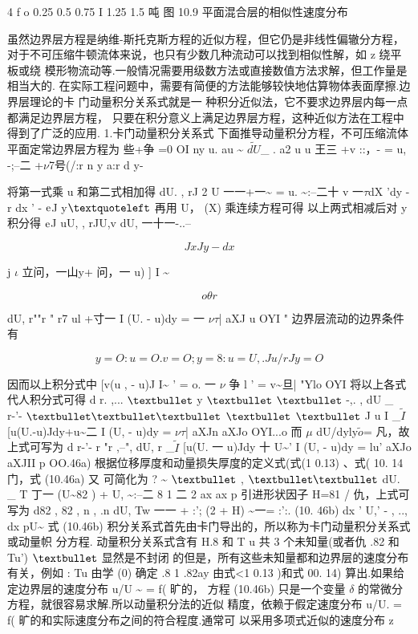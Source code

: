 4 f o 0.25 0.5 0.75 I 1.25 1.5 吨 图 10.9 平面混合层的相似性速度分布

虽然边界层方程是纳维-斯托克斯方程的近似方程，但它仍是非线性偏辙分方程， 对于不可压缩牛顿流体来说，也只有少数几种流动可以找到相似性解，如 z 绕平板或绕 模形物流动等.一般情况需要用级数方法或直接数值方法求解，但工作量是相当大的. 在实际工程问题中，需要有简便的方法能够较快地估算物体表面摩擦.边界层理论的卡 门动量积分关系式就是一 种积分近似法，它不要求边界层内每一点都满足边界层方程， 只要在积分意义上满足边界层方程，这种近似方法在工程中得到了广泛的应用. 1.卡门动量积分关系式 下面推导动量积分方程，不可压缩流体平面定常边界层方程为 些+争 =0 OI ny u. au \textasciitilde{} $\tilde{dU}$\_ . a2 u u 王三 +v ::，- = u, -;--二 +$\nu$7号(/:r n y a:r d y-

将第一式乘 u 和第二式相加得 dU. , rJ 2 U 一一+一\textasciitilde{} = u. \textasciitilde{}:--二十 v 一$\tau$dX 'dy - r dx ' - ${\rm e}$J y${\rm ‘}$ 再用 U， (X) 乘连续方程可得 以上两式相减后对 y 积分得 ${\rm e}$J uU, , rJU,v dU, 一十一-..--

\[Jx Jy - dx\]

j $\iota$ 立问，一山y+ 问，一 u) ] I \textasciitilde{}

\[o\theta r\]

dU, r""r " r7 ul +寸一 I (U. - u)dy = 一 $\nu$$\tau$| aXJ u OYI " 边界层流动的边界条件有

\[y=O:u=O.v=O; y=8: u=U,. Ju/ rJ y=O\]

因而以上积分式中 [v(u , - u)J I\textasciitilde{} ' = o. 一 $\nu$ 争 l ' = v\textasciitilde{}旦| "Ylo OYI 将以上各式代人积分式可得 d r. ,... ${\rm •}$ y ${\rm •}$ ${\rm •}$ -,. , dU \_ r-'- ${\rm •••}$ ${\rm •}$ ${\rm •}$ J u I \_$\tilde{I}$ [u(U.-u)Jdy+u\textasciitilde{}二 I (U, - u)dy = $\nu$$\tau$| aXJn aXJo OYI...o 而 $\mu$ dU/dyly$\tilde{o}$= 凡，故上式可写为 d r-'- r "r ,--", dU, r \_$\tilde{I}$ [u(U. 一 u)Jdy 十 U\textasciitilde{}' I (U, - u)dy = lu' aXJo aXJII p OO.46a) 根据位移厚度和动量损失厚度的定义式(式(1 0.13) 、式( 10. 14 门，式 (10.46a) 又 可简化为 ? \textasciitilde{} ${\rm •}$ , ${\rm ••}$ dU. \_ T 丁一 (U\textasciitilde{}82 ) + U, \textasciitilde{}:--二 8 1 二 2 ax ax p 引进形状因子 H=81 / 仇，上式可写为 d82 , 82 , n , .n dU, Tw 一一 + :'; (2 + H) \textasciitilde{}一= :':. (10. 46b) dx ' U,' - , .., dx pU\textasciitilde{} 式 (10.46b) 积分关系式首先由卡门导出的，所以称为卡门动量积分关系式或动量帜 分方程. 动量积分关系式含有 H.8 和 T u 共 3 个未知量(或者仇 .82 和 Tu') ${\rm •}$ 显然是不封闭 的但是，所有这些未知量都和边界层的速度分布有关，例如 : Tu 由学 (0) 确定 .8 1 .82ay 由式<1 0.13 )和式 00. 14) 算出.如果给定边界层的速度分布 u/U \textasciitilde{} = f( 旷的， 方程 (10.46b) 只是一个变量 $\delta$ 的常微分方程，就很容易求解.所以动量积分法的近似 精度，依赖于假定速度分布 u/U. = f( 旷的和实际速度分布之间的符合程度.通常可 以采用多项式近似的速度分布 z

